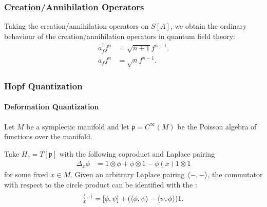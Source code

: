 \documentclass{beamer}
\begin{document}
\begin{frame}


\frametitle{Creation/Annihilation Operators}

Taking the creation/annihilation operators on $S[A]$, we obtain the ordinary behaviour of the creation/annihilation operators in quantum field theory:
\begin{equation}
\begin{split}
a_f^{\dagger} f^n &= \sqrt{n+1} f^{n+1}. \\
a_f f^n &= \sqrt{n} f^{n-1}.
\end{split}
\end{equation}



\end{frame}




\begin{frame}

\frametitle{Hopf Quantization}

\framesubtitle{Deformation Quantization}

 Let $M$ be a symplectic manifold and let $\mathfrak{p} = C^\infty(M)$ be the Poisson algebra of functions over the manifold. 

 Take $H_c = T[\mathfrak{p}]$ with the following coproduct and Laplace pairing
\begin{align*}
\Delta_x \phi &= 1 \otimes \phi + \phi \otimes 1 - \phi(x) 1 \otimes 1
\end{align*}
for some fixed $x \in M$. Given an arbitrary Laplace pairing $\left\langle -,- \right\rangle$, the commutator with respect to the circle product can be identified with the :
%
\begin{equation}
[\phi, \psi]_x^{\gen{\cdot, \cdot}} = [\phi, \psi] + (\gen{\phi, \psi} - \gen{\psi, \phi}) 1.
\end{equation}

\end{frame}



\end{document}
